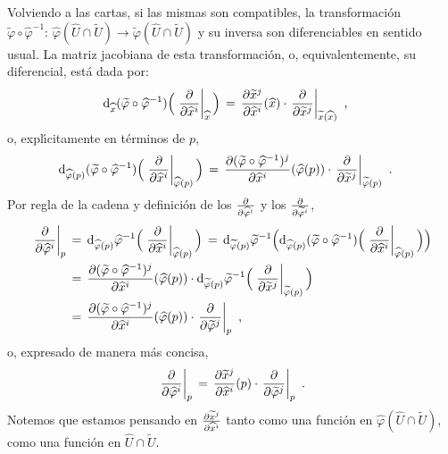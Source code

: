 Volviendo a las cartas, si las mismas son compatibles, la transformaci\'{o}n
$\widetilde{\varphi}\circ\widehat{\varphi}^{-1}:\,%
\widehat{\varphi}(\widehat{U}\cap\widetilde{U})\rightarrow%
\widetilde{\varphi}(\widehat{U}\cap\widetilde{U})$ y su inversa son
diferenciables en sentido usual. La matriz jacobiana de esta
transformaci\'{o}n, o, equivalentemente, su diferencial, est\'{a} dada por:
\begin{align*}
	\diferencial[\widehat{x}]%
		{(\widetilde{\varphi}\circ\widehat{\varphi}^{-1})}
		\Big(\gancho[\widehat{x}]{\widehat{x}^{i}}\Big) & \,=\,
		\derivada{\widetilde{x}^{j}}{\widehat{x}^{i}}(\widehat{x})
		\cdot\gancho[\widetilde{x}(\widehat{x})]{\widetilde{x}^{j}}
	\text{ ,}
\end{align*}
%
o, expl\'{\i}citamente en t\'{e}rminos de $p$,
\begin{align*}
	\diferencial[\widehat{\varphi}(p)]%
		{(\widetilde{\varphi}\circ\widehat{\varphi}^{-1})}
		\Big(\gancho[\widehat{\varphi}(p)]{\widehat{x}^{i}}\Big) &
	\,=\,\derivada%
		{(\widetilde{\varphi}\circ\widehat{\varphi}^{-1})^{j}}%
		{\widehat{x}^{i}}(\widehat{\varphi}(p))
		\cdot\gancho[\widetilde{\varphi}(p)]{\widetilde{x}^{j}}
	\text{ .}
\end{align*}
%
Por regla de la cadena y definici\'{o}n de los $\gancho{\widehat{\varphi}^{i}}$
y los $\gancho{\widetilde{\varphi}^{i}}$,
\begin{align*}
	\gancho[p]{\widehat{\varphi}^{i}} & \,=\,
	\diferencial[\widehat{\varphi}(p)]{\widehat{\varphi}^{-1}}
		\Big(
		\gancho[\widehat{\varphi}(p)]{\widehat{x}^{i}}
		\Big)
	\,=\,\diferencial[\widetilde{\varphi}(p)]{\widetilde{\varphi}^{-1}}
		\Big(
		\diferencial[\widehat{\varphi}(p)]%
			{(\widetilde{\varphi}\circ\widehat{\varphi}^{-1})}
			\Big(
			\gancho[\widehat{\varphi}(p)]{\widehat{x}^{i}}
			\Big)
		\Big) \\
	& \,=\,\derivada%
		{(\widetilde{\varphi}\circ\widehat{\varphi}^{-1})^{j}}%
		{\widehat{x}^{i}}(\widehat{\varphi}(p))
		\cdot
		\diferencial[\widetilde{\varphi}(p)]{\widetilde{\varphi}^{-1}}
			\Big(
			\gancho[\widetilde{\varphi}(p)]{\widetilde{x}^{j}}
			\Big) \\
	& \,=\,\derivada%
		{(\widetilde{\varphi}\circ\widehat{\varphi}^{-1})^{j}}%
		{\widehat{x}^{i}}(\widehat{\varphi}(p))
		\cdot
		\gancho[p]{\widetilde{\varphi}^{j}}
	\text{ ,}
\end{align*}
%
o, expresado de manera m\'{a}s concisa,
\begin{equation}
	\label{eq:cambiodecoordenadas}
	\gancho[p]{\widehat{\varphi}^{i}} \,=\,
		\derivada{\widetilde{x}^{j}}{\widehat{x}^{i}}(p)
		\cdot
		\gancho[p]{\widetilde{\varphi}^{j}}
	\text{ .}
\end{equation}
%
Notemos que estamos pensando en $\frac{\partial{\widetilde{x}^{j}}}{\partial{\widehat{x}^{i}}}$
tanto como una funci\'{o}n en
$\widehat{\varphi}(\widehat{U}\cap\widetilde{U})$, como una funci\'{o}n
en $\widehat{U}\cap\widetilde{U}$.

